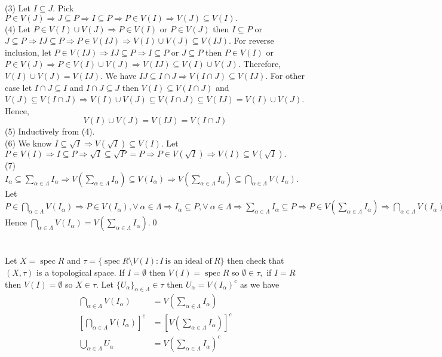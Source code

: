 \documentclass[11pt]{amsart}
\DeclareMathOperator{\spec}{\text{spec}}
\begin{document}
\proof (3) Let $I\subseteq J$. Pick $P\in V(J) \Rightarrow J\subseteq P \Rightarrow I\subseteq P \Rightarrow P\in V(I) \Rightarrow V(J)\subseteq V(I).$\\
(4) Let $P\in V(I)\cup V(J) \Rightarrow P\in V(I)$ or $P\in V(J)$ then $I\subseteq P$ or $J\subseteq P \Rightarrow IJ\subseteq P \Rightarrow P\in V(IJ) \Rightarrow V(I)\cup V(J)\subseteq V(IJ).$ For reverse inclusion, let $P\in V(IJ) \Rightarrow IJ\subseteq P \Rightarrow I\subseteq P$ or $J\subseteq P$ then $P\in V(I)$ or $P\in V(J) \Rightarrow P\in V(I)\cup V(J) \Rightarrow V(IJ)\subseteq V(I)\cup V(J)$. Therefore, $V(I)\cup V(J)=V(IJ).$
We have $IJ\subseteq I\cap J \Rightarrow V(I\cap J)\subseteq V(IJ).$ For other case let $I\cap J\subseteq I$ and $I\cap J\subseteq J$ then $V(I)\subseteq V(I\cap J)$ and $V(J)\subseteq V(I\cap J) \Rightarrow V(I)\cup V(J)\subseteq V(I\cap J)\subseteq V(IJ)=V(I)\cup V(J)$. Hence, $$V(I)\cup V(J)=V(IJ)=V(I\cap J)$$
(5) Inductively from (4).\\
(6) We know $I\subseteq \sqrt{I} \Rightarrow V(\sqrt{I})\subseteq V(I).$ Let $P\in V(I) \Rightarrow I\subseteq P \Rightarrow \sqrt{I}\subseteq \sqrt{P}=P \Rightarrow P\in V(\sqrt{I}) \Rightarrow V(I)\subseteq V(\sqrt{I}).$\\
(7) $I_{\alpha}\subseteq \displaystyle\sum_{\alpha\in \Lambda} I_{\alpha} \Rightarrow V\left(\displaystyle\sum_{\alpha\in \Lambda} I_{\alpha}\right)\subseteq V(I_{\alpha}) \Rightarrow V\left(\displaystyle\sum_{\alpha\in \Lambda} I_{\alpha}\right)\subseteq \bigcap_{\alpha\in \Lambda} V(I_{\alpha}).$  Let $P\in \displaystyle\bigcap_{\alpha\in \Lambda} V(I_{\alpha}) \Rightarrow P\in V(I_{\alpha}),\forall~\alpha\in \Lambda \Rightarrow I_{\alpha}\subseteq P,\forall~\alpha\in \Lambda \Rightarrow \displaystyle\sum_{\alpha\in \Lambda} I_{\alpha} \subseteq P \Rightarrow P\in V\left(\displaystyle\sum_{\alpha\in \Lambda} I_{\alpha}\right) \Rightarrow \bigcap_{\alpha\in \Lambda} V(I_{\alpha})\subseteq V\left(\displaystyle\sum_{\alpha\in \Lambda} I_{\alpha}\right).$ Hence $\displaystyle\bigcap_{\alpha\in \Lambda} V(I_{\alpha})=V\left(\displaystyle\sum_{\alpha\in \Lambda} I_{\alpha}\right)$.\qed\\\\\\
Let $X=\spec R$ and $\tau=\{\spec R\setminus V(I):I~\text{is an ideal of}~R\}$ then check that $(X,\tau)$ is a topological space. If $I=\emptyset$ then $V(I)=\spec R$ so $\emptyset\in \tau,$ if $I=R$ then $V(I)=\emptyset$ so $X\in \tau.$ Let $\{U_{\alpha}\}_{\alpha\in \Lambda} \in \tau$ then $U_{\alpha}=V(I_{\alpha})^c$ as we have \begin{align*}
\displaystyle\bigcap_{\alpha\in \Lambda} V(I_{\alpha})&=V\left(\displaystyle\sum_{\alpha\in \Lambda} I_{\alpha}\right)\\
\left[\displaystyle\bigcap_{\alpha\in \Lambda} V(I_{\alpha})\right]^c&=\left[V\left(\displaystyle\sum_{\alpha\in \Lambda} I_{\alpha}\right)\right]^c\\
\displaystyle\bigcup_{\alpha\in \Lambda}U_{\alpha}&=V\left(\displaystyle\sum_{\alpha\in \Lambda} I_{\alpha} \right)^c
\end{align*}
\end{document}

